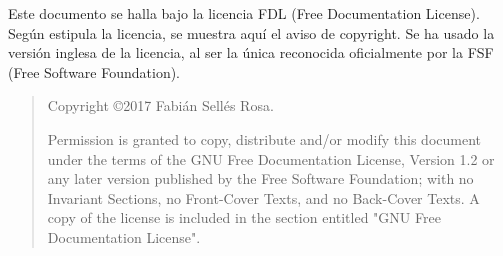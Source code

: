 \bigskip
\bigskip
\bigskip
\bigskip

\newpage{}

Este documento se halla bajo la licencia FDL (Free Documentation License). Según estipula la
licencia, se muestra aquí el aviso de copyright. Se ha usado la
versión inglesa de la licencia, al ser la única reconocida
oficialmente por la \href{http://www.fsf.org/}{}FSF (Free Software Foundation).

\begin{quote}
  Copyright \copyright  2017  Fabián Sellés Rosa.
  
  Permission is granted to copy, distribute and/or modify this document
  under the terms of the GNU Free Documentation License, Version 1.2
  or any later version published by the Free Software Foundation;
  with no Invariant Sections, no Front-Cover Texts, and no Back-Cover Texts.
  A copy of the license is included in the section entitled "GNU
  Free Documentation License".
\end{quote}
\newpage{}
